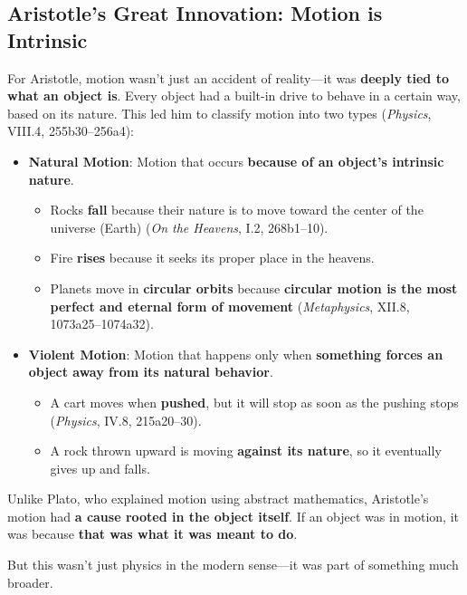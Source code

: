 \subsection{Aristotle’s Great Innovation: Motion is Intrinsic}

For Aristotle, motion wasn’t just an accident of reality—it was \textbf{deeply tied to what an object is}. Every object had a built-in drive to behave in a certain way, based on its nature. This led him to classify motion into two types (\textit{Physics}, VIII.4, 255b30–256a4):

\begin{itemize}
    \item \textbf{Natural Motion}: Motion that occurs \textbf{because of an object’s intrinsic nature}.
    \begin{itemize}
        \item Rocks \textbf{fall} because their nature is to move toward the center of the universe (Earth) (\textit{On the Heavens}, I.2, 268b1–10).
        \item Fire \textbf{rises} because it seeks its proper place in the heavens.
        \item Planets move in \textbf{circular orbits} because \textbf{circular motion is the most perfect and eternal form of movement} (\textit{Metaphysics}, XII.8, 1073a25–1074a32).
    \end{itemize}
    \item \textbf{Violent Motion}: Motion that happens only when \textbf{something forces an object away from its natural behavior}.
    \begin{itemize}
        \item A cart moves when \textbf{pushed}, but it will stop as soon as the pushing stops (\textit{Physics}, IV.8, 215a20–30).
        \item A rock thrown upward is moving \textbf{against its nature}, so it eventually gives up and falls.
    \end{itemize}
\end{itemize}

Unlike Plato, who explained motion using abstract mathematics, Aristotle’s motion had \textbf{a cause rooted in the object itself}. If an object was in motion, it was because \textbf{that was what it was meant to do}.

But this wasn’t just physics in the modern sense—it was part of something much broader.


